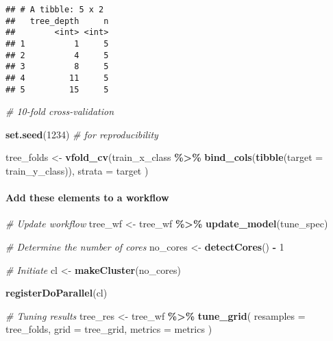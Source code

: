 \documentclass[
]{book}
\newenvironment{Shaded}{\begin{snugshade}}{\end{snugshade}}
\newcommand{\CommentTok}[1]{\textcolor[rgb]{0.56,0.35,0.01}{\textit{#1}}}
\newcommand{\DataTypeTok}[1]{\textcolor[rgb]{0.13,0.29,0.53}{#1}}
\newcommand{\DecValTok}[1]{\textcolor[rgb]{0.00,0.00,0.81}{#1}}
\newcommand{\KeywordTok}[1]{\textcolor[rgb]{0.13,0.29,0.53}{\textbf{#1}}}
\newcommand{\NormalTok}[1]{#1}
\newcommand{\OperatorTok}[1]{\textcolor[rgb]{0.81,0.36,0.00}{\textbf{#1}}}
\newcommand{\StringTok}[1]{\textcolor[rgb]{0.31,0.60,0.02}{#1}}
\begin{document}
\begin{verbatim}
## # A tibble: 5 x 2
##   tree_depth     n
##        <int> <int>
## 1          1     5
## 2          4     5
## 3          8     5
## 4         11     5
## 5         15     5
\end{verbatim}

\begin{Shaded}
\begin{Highlighting}[]
\CommentTok{\# 10{-}fold cross{-}validation}

\KeywordTok{set.seed}\NormalTok{(}\DecValTok{1234}\NormalTok{) }\CommentTok{\# for reproducibility}

\NormalTok{tree\_folds \textless{}{-}}\StringTok{ }\KeywordTok{vfold\_cv}\NormalTok{(train\_x\_class }\OperatorTok{\%\textgreater{}\%}\StringTok{ }\KeywordTok{bind\_cols}\NormalTok{(}\KeywordTok{tibble}\NormalTok{(}\DataTypeTok{target =}\NormalTok{ train\_y\_class)),}
  \DataTypeTok{strata =}\NormalTok{ target}
\NormalTok{)}
\end{Highlighting}
\end{Shaded}

\hypertarget{add-these-elements-to-a-workflow-1}{%
\paragraph{Add these elements to a workflow}\label{add-these-elements-to-a-workflow-1}}

\begin{Shaded}
\begin{Highlighting}[]
\CommentTok{\# Update workflow}
\NormalTok{tree\_wf \textless{}{-}}\StringTok{ }\NormalTok{tree\_wf }\OperatorTok{\%\textgreater{}\%}\StringTok{ }\KeywordTok{update\_model}\NormalTok{(tune\_spec)}

\CommentTok{\# Determine the number of cores}
\NormalTok{no\_cores \textless{}{-}}\StringTok{ }\KeywordTok{detectCores}\NormalTok{() }\OperatorTok{{-}}\StringTok{ }\DecValTok{1}

\CommentTok{\# Initiate}
\NormalTok{cl \textless{}{-}}\StringTok{ }\KeywordTok{makeCluster}\NormalTok{(no\_cores)}

\KeywordTok{registerDoParallel}\NormalTok{(cl)}

\CommentTok{\# Tuning results}
\NormalTok{tree\_res \textless{}{-}}\StringTok{ }\NormalTok{tree\_wf }\OperatorTok{\%\textgreater{}\%}
\StringTok{  }\KeywordTok{tune\_grid}\NormalTok{(}
    \DataTypeTok{resamples =}\NormalTok{ tree\_folds,}
    \DataTypeTok{grid =}\NormalTok{ tree\_grid,}
    \DataTypeTok{metrics =}\NormalTok{ metrics}
\NormalTok{  )}
\end{Highlighting}
\end{Shaded}
\end{document}
